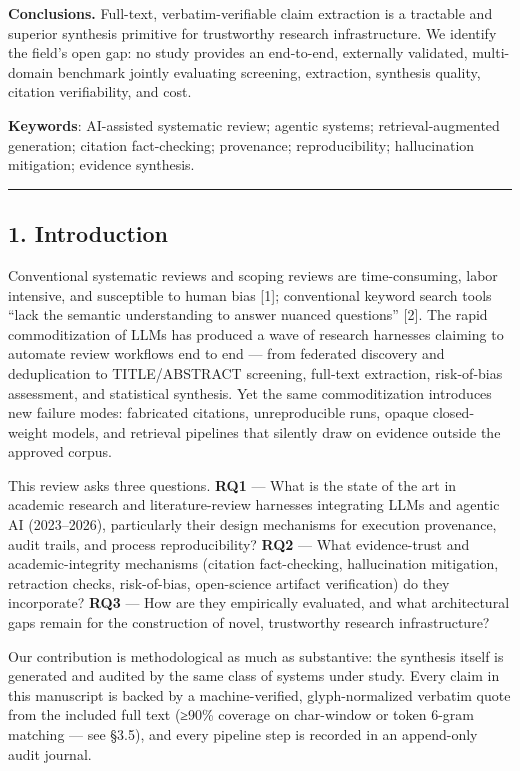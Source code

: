 \documentclass[11pt]{article}
\begin{document}
\textbf{Conclusions.} Full-text, verbatim-verifiable claim extraction is
a tractable and superior synthesis primitive for trustworthy research
infrastructure. We identify the field's open gap: no study provides an
end-to-end, externally validated, multi-domain benchmark jointly
evaluating screening, extraction, synthesis quality, citation
verifiability, and cost.

\textbf{Keywords}: AI-assisted systematic review; agentic systems;
retrieval-augmented generation; citation fact-checking; provenance;
reproducibility; hallucination mitigation; evidence synthesis.

\begin{center}\rule{0.5\linewidth}{0.5pt}\end{center}

\subsection{1. Introduction}\label{introduction}

Conventional systematic reviews and scoping reviews are time-consuming,
labor intensive, and susceptible to human bias {[}1{]}; conventional
keyword search tools ``lack the semantic understanding to answer nuanced
questions'' {[}2{]}. The rapid commoditization of LLMs has produced a
wave of research harnesses claiming to automate review workflows end to
end --- from federated discovery and deduplication to TITLE/ABSTRACT
screening, full-text extraction, risk-of-bias assessment, and
statistical synthesis. Yet the same commoditization introduces new
failure modes: fabricated citations, unreproducible runs, opaque
closed-weight models, and retrieval pipelines that silently draw on
evidence outside the approved corpus.

This review asks three questions. \textbf{RQ1} --- What is the state of
the art in academic research and literature-review harnesses integrating
LLMs and agentic AI (2023--2026), particularly their design mechanisms
for execution provenance, audit trails, and process reproducibility?
\textbf{RQ2} --- What evidence-trust and academic-integrity mechanisms
(citation fact-checking, hallucination mitigation, retraction checks,
risk-of-bias, open-science artifact verification) do they incorporate?
\textbf{RQ3} --- How are they empirically evaluated, and what
architectural gaps remain for the construction of novel, trustworthy
research infrastructure?

Our contribution is methodological as much as substantive: the synthesis
itself is generated and audited by the same class of systems under
study. Every claim in this manuscript is backed by a machine-verified,
glyph-normalized verbatim quote from the included full text (≥90\%
coverage on char-window or token 6-gram matching --- see §3.5), and
every pipeline step is recorded in an append-only audit journal.
\end{document}
